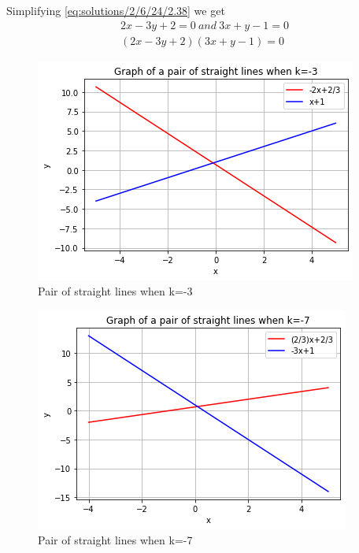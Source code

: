 Simplifying \eqref{eq:solutions/2/6/24/2.38} we get 
\begin{equation} \label{eq:solutions/2/6/24/2.39}
\begin{split}
2x - 3y + 2 = 0~ and ~3x + y - 1 = 0\\
\boxed{(2x - 3y + 2)(3x + y - 1) = 0}
\end{split}
\end{equation}
\begin{figure}[!htb]
   \centering
   \includegraphics[width=\columnwidth]{solutions/2/6/24/fig1.png}
   \caption{Pair of straight lines when k=-3}
   \label{eq:solutions/2/6/24/fig:1}
\end{figure}
\begin{figure}[!htb]
   \includegraphics[width=\columnwidth]{solutions/2/6/24/fig2.png}
   \caption{Pair of straight lines when k=-7}
   \label{eq:solutions/2/6/24/fig:2}
\end{figure}
